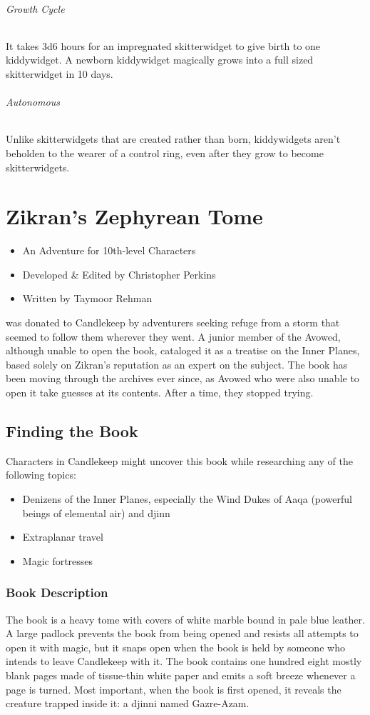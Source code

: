 \documentclass[10pt,a4paper,twoside,bg=print,twocolumn,openany,nodeprecatedcode]{dndbook}
\begin{document}
\subparagraph{Growth Cycle}
It takes 3d6 hours for an impregnated skitterwidget to give birth to one kiddywidget. A newborn kiddywidget magically grows into a full sized skitterwidget in 10 days.

\subparagraph{Autonomous}
Unlike skitterwidgets that are created rather than born, kiddywidgets aren't beholden to the wearer of a control ring, even after they grow to become skitterwidgets.

\chapter{Zikran's Zephyrean Tome}

\begin{itemize}
\item An Adventure for 10th-level Characters
\item Developed \& Edited by Christopher Perkins
\item Written by Taymoor Rehman
\end{itemize}

 was donated to Candlekeep by adventurers seeking refuge from a storm that seemed to follow them wherever they went. A junior member of the Avowed, although unable to open the book, cataloged it as a treatise on the Inner Planes, based solely on Zikran's reputation as an expert on the subject. The book has been moving through the archives ever since, as Avowed who were also unable to open it take guesses at its contents. After a time, they stopped trying.


\section{Finding the Book}
Characters in Candlekeep might uncover this book while researching any of the following topics:


\begin{itemize}
\item Denizens of the Inner Planes, especially the Wind Dukes of Aaqa (powerful beings of elemental air) and djinn
\item Extraplanar travel
\item Magic fortresses
\end{itemize}

\subsection{Book Description}
The book is a heavy tome with covers of white marble bound in pale blue leather. A large padlock prevents the book from being opened and resists all attempts to open it with magic, but it snaps open when the book is held by someone who intends to leave Candlekeep with it. The book contains one hundred eight mostly blank pages made of tissue-thin white paper and emits a soft breeze whenever a page is turned. Most important, when the book is first opened, it reveals the creature trapped inside it: a djinni named Gazre-Azam.
\end{document}
